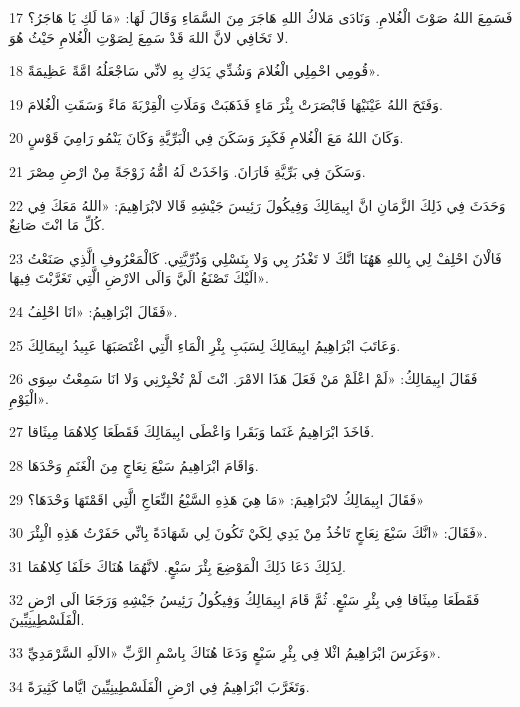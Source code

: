 \par 17 فَسَمِعَ اللهُ صَوْتَ الْغُلامِ. وَنَادَى مَلاكُ اللهِ هَاجَرَ مِنَ السَّمَاءِ وَقَالَ لَهَا: «مَا لَكِ يَا هَاجَرُ؟ لا تَخَافِي لانَّ اللهَ قَدْ سَمِعَ لِصَوْتِ الْغُلامِ حَيْثُ هُوَ.
\par 18 قُومِي احْمِلِي الْغُلامَ وَشُدِّي يَدَكِ بِهِ لانِّي سَاجْعَلُهُ امَّةً عَظِيمَةً».
\par 19 وَفَتَحَ اللهُ عَيْنَيْهَا فَابْصَرَتْ بِئْرَ مَاءٍ فَذَهَبَتْ وَمَلَاتِ الْقِرْبَةَ مَاءً وَسَقَتِ الْغُلامَ.
\par 20 وَكَانَ اللهُ مَعَ الْغُلامِ فَكَبِرَ وَسَكَنَ فِي الْبَرِّيَّةِ وَكَانَ يَنْمُو رَامِيَ قَوْسٍ.
\par 21 وَسَكَنَ فِي بَرِّيَّةِ فَارَانَ. وَاخَذَتْ لَهُ امُّهُ زَوْجَةً مِنْ ارْضِ مِصْرَ.
\par 22 وَحَدَثَ فِي ذَلِكَ الزَّمَانِ انَّ ابِيمَالِكَ وَفِيكُولَ رَئِيسَ جَيْشِهِ قَالا لابْرَاهِيمَ: «اللهُ مَعَكَ فِي كُلِّ مَا انْتَ صَانِعٌ.
\par 23 فَالْانَ احْلِفْ لِي بِاللهِ هَهُنَا انَّكَ لا تَغْدُرُ بِي وَلا بِنَسْلِي وَذُرِّيَّتِي. كَالْمَعْرُوفِ الَّذِي صَنَعْتُ الَيْكَ تَصْنَعُ الَيَّ وَالَى الارْضِ الَّتِي تَغَرَّبْتَ فِيهَا».
\par 24 فَقَالَ ابْرَاهِيمُ: «انَا احْلِفُ».
\par 25 وَعَاتَبَ ابْرَاهِيمُ ابِيمَالِكَ لِسَبَبِ بِئْرِ الْمَاءِ الَّتِي اغْتَصَبَهَا عَبِيدُ ابِيمَالِكَ.
\par 26 فَقَالَ ابِيمَالِكُ: «لَمْ اعْلَمْ مَنْ فَعَلَ هَذَا الامْرَ. انْتَ لَمْ تُخْبِرْنِي وَلا انَا سَمِعْتُ سِوَى الْيَوْمِ».
\par 27 فَاخَذَ ابْرَاهِيمُ غَنَما وَبَقَرا وَاعْطَى ابِيمَالِكَ فَقَطَعَا كِلاهُمَا مِيثَاقا.
\par 28 وَاقَامَ ابْرَاهِيمُ سَبْعَ نِعَاجٍ مِنَ الْغَنَمِ وَحْدَهَا.
\par 29 فَقَالَ ابِيمَالِكُ لابْرَاهِيمَ: «مَا هِيَ هَذِهِ السَّبْعُ النِّعَاجِ الَّتِي اقَمْتَهَا وَحْدَهَا؟»
\par 30 فَقَالَ: «انَّكَ سَبْعَ نِعَاجٍ تَاخُذُ مِنْ يَدِي لِكَيْ تَكُونَ لِي شَهَادَةً بِانِّي حَفَرْتُ هَذِهِ الْبِئْرَ».
\par 31 لِذَلِكَ دَعَا ذَلِكَ الْمَوْضِعَ بِئْرَ سَبْعٍ. لانَّهُمَا هُنَاكَ حَلَفَا كِلاهُمَا.
\par 32 فَقَطَعَا مِيثَاقا فِي بِئْرِ سَبْعٍ. ثُمَّ قَامَ ابِيمَالِكُ وَفِيكُولُ رَئِيسُ جَيْشِهِ وَرَجَعَا الَى ارْضِ الْفَلَسْطِينِيِّينَ.
\par 33 وَغَرَسَ ابْرَاهِيمُ اثْلا فِي بِئْرِ سَبْعٍ وَدَعَا هُنَاكَ بِاسْمِ الرَّبِّ «الالَهِ السَّرْمَدِيِّ».
\par 34 وَتَغَرَّبَ ابْرَاهِيمُ فِي ارْضِ الْفَلَسْطِينِيِّينَ ايَّاما كَثِيرَةً.

